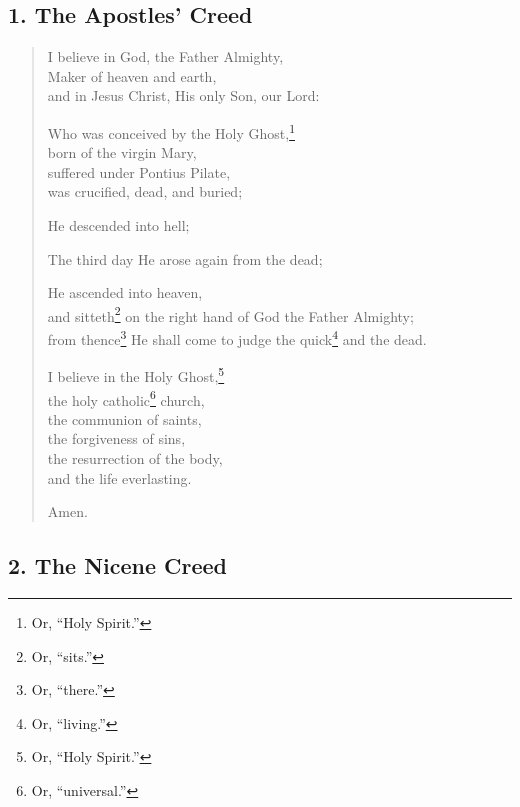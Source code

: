\documentclass[
]{book}
\begin{document}
\protect\hypertarget{chapter-slug-81-the-creeds}{\href{}{}}
\protect\hypertarget{81}{\href{}{}}

\hypertarget{the-apostles-creed}{%
\subsection*{\texorpdfstring{1. \textbf{The Apostles' Creed}}{1. The Apostles' Creed}}\label{the-apostles-creed}}

\begin{quote}
I believe in God, the Father Almighty,\\
Maker of heaven and earth,\\
and in Jesus Christ, His only Son, our Lord:

Who was conceived by the Holy Ghost,\footnote{Or, ``Holy Spirit.''}\\
born of the virgin Mary,\\
suffered under Pontius Pilate,\\
was crucified, dead, and buried;

He descended into hell;

The third day He arose again from the dead;

He ascended into heaven,\\
and sitteth\footnote{Or, ``sits.''} on the right hand of God the Father Almighty;\\
from thence\footnote{Or, ``there.''} He shall come to judge the quick\footnote{Or, ``living.''} and the dead.

I believe in the Holy Ghost,\footnote{Or, ``Holy Spirit.''}\\
the holy catholic\footnote{Or, ``universal.''} church,\\
the communion of saints,\\
the forgiveness of sins,\\
the resurrection of the body,\\
and the life everlasting.

Amen.
\end{quote}

\hypertarget{the-nicene-creed}{%
\subsection*{\texorpdfstring{2. \textbf{The Nicene Creed}}{2. The Nicene Creed}}\label{the-nicene-creed}}
\end{document}
